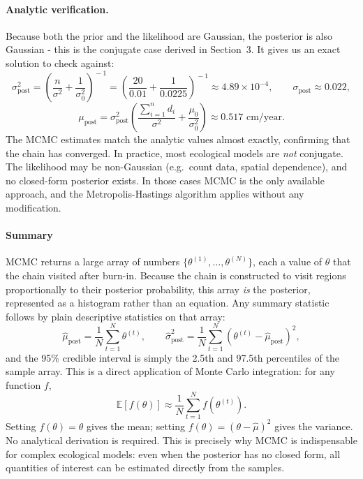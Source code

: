 \documentclass[12pt, a4paper]{article}
\begin{document}
\paragraph{Analytic verification.}
Because both the prior and the likelihood are Gaussian, the posterior
is also Gaussian - this is the conjugate case derived in Section~3.
It gives us an exact solution to check against:
\[
    \sigma_\text{post}^2
        = \left(\frac{n}{\sigma^2}+\frac{1}{\sigma_0^2}\right)^{\!-1}
        = \left(\frac{20}{0.01}+\frac{1}{0.0225}\right)^{\!-1}
        \approx 4.89 \times 10^{-4},
    \qquad
    \sigma_\text{post} \approx 0.022,
\]
\[
    \mu_\text{post}
        = \sigma_\text{post}^2\!
          \left(\frac{\sum_{i=1}^n d_i}{\sigma^2}
               +\frac{\mu_0}{\sigma_0^2}\right)
        \approx 0.517 \text{ cm/year}.
\]
The MCMC estimates match the analytic values almost exactly,
confirming that the chain has converged. In practice, most ecological
models are \emph{not} conjugate. The likelihood may be non-Gaussian
(e.g.\ count data, spatial dependence), and no
closed-form posterior exists. In those cases MCMC is the only
available approach, and the Metropolis-Hastings algorithm applies
without any modification.

\paragraph{Summary}
MCMC returns a large array of numbers $\{\theta^{(1)}, \ldots, \theta^{(N)}\}$, each a value
of $\theta$ that the chain visited after burn-in. Because the chain is
constructed to visit regions proportionally to their posterior
probability, this array \emph{is} the posterior, represented as a
histogram rather than an equation. Any summary statistic follows by
plain descriptive statistics on that array:
\[
    \hat{\mu}_\text{post} = \frac{1}{N}\sum_{t=1}^{N}\theta^{(t)},
    \qquad
    \hat{\sigma}^2_\text{post}
        = \frac{1}{N}\sum_{t=1}^{N}\!\left(\theta^{(t)}-\hat{\mu}_\text{post}\right)^{\!2},
\]
and the 95\% credible interval is simply the 2.5th and 97.5th
percentiles of the sample array. This is a direct application of
Monte Carlo integration: for any function $f$,
\[
    \mathbb{E}[f(\theta)] \approx \frac{1}{N}\sum_{t=1}^{N}f\!\left(\theta^{(t)}\right).
\]
Setting $f(\theta)=\theta$ gives the mean; setting
$f(\theta)=(\theta-\hat{\mu})^2$ gives the variance. No analytical
derivation is required. This is precisely why MCMC is indispensable
for complex ecological models: even when the posterior has no closed
form, all quantities of interest can be estimated directly from the
samples.
\end{document}
